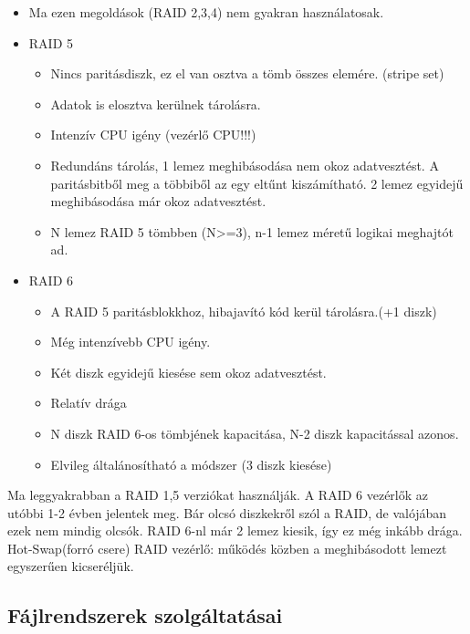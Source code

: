 \documentclass[margin=0px]{article}
\begin{document}
\begin{itemize}
    \item Ma ezen megoldások (RAID 2,3,4) nem gyakran használatosak.
    \item RAID 5
          \begin{itemize}
              \item Nincs paritásdiszk, ez el van osztva a tömb összes elemére. (stripe set)
              \item Adatok is elosztva kerülnek tárolásra.
              \item Intenzív CPU igény (vezérlő CPU!!!)
              \item Redundáns tárolás, 1 lemez meghibásodása nem okoz adatvesztést. A paritásbitből meg a többiből az egy eltűnt kiszámítható. 2 lemez egyidejű meghibásodása már okoz adatvesztést.
              \item N lemez RAID 5 tömbben (N>=3), n-1 lemez méretű logikai meghajtót ad.
          \end{itemize}
    \item RAID 6
          \begin{itemize}
              \item A RAID 5 paritásblokkhoz, hibajavító kód kerül tárolásra.(+1 diszk)
              \item Még intenzívebb CPU igény.
              \item Két diszk egyidejű kiesése sem okoz adatvesztést.
              \item Relatív drága
              \item N diszk RAID 6-os tömbjének kapacitása, N-2 diszk kapacitással azonos.
              \item Elvileg általánosítható a módszer (3 diszk kiesése)
          \end{itemize}
\end{itemize}
Ma leggyakrabban a RAID 1,5 verziókat használják. A RAID 6 vezérlők az utóbbi 1-2 évben jelentek meg. Bár olcsó diszkekről szól a RAID, de valójában ezek nem mindig olcsók. RAID 6-nl már 2 lemez kiesik, így ez még inkább drága. \\
Hot-Swap(forró csere) RAID vezérlő: működés közben a meghibásodott lemezt egyszerűen kicseréljük.

\subsection{Fájlrendszerek szolgáltatásai}
\end{document}
